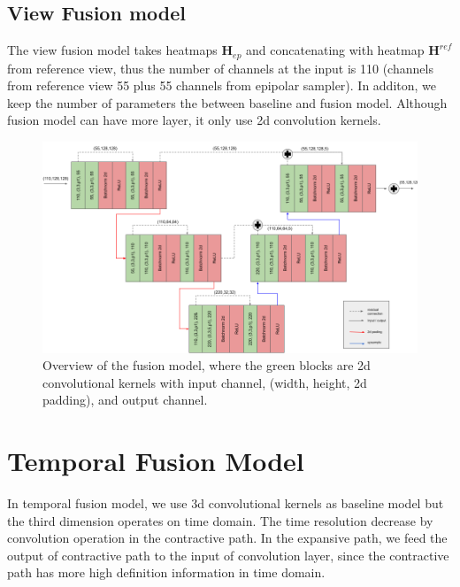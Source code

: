 \subsection{View Fusion model}
The view fusion model takes heatmaps $\mathbf{H}_{ep}$ and concatenating with heatmap $\mathbf{H}^{ref}$ from reference view, thus the number of channels at the input is 110 (channels from reference view 55 plus 55 channels from epipolar sampler). In additon, we keep the number of parameters the between baseline and fusion model. Although fusion model can have more layer, it only use 2d convolution kernels. 
\begin{figure}
	\centering
	\includegraphics[width=1.0\columnwidth]{figures/ch4/view-fusion.png}
	\caption{Overview of the fusion model, where the green blocks are 2d convolutional kernels with input channel, (width, height, 2d padding), and output channel.}
	\label{fig:view-baseline}
\end{figure}

\section{Temporal Fusion Model}
In temporal fusion model, we use 3d convolutional kernels as baseline model but the third dimension operates on time domain. The time resolution decrease by convolution operation in the contractive path. In the expansive path, we feed the output of contractive path to the input of convolution layer, since the contractive path has more high definition information in time domain.
